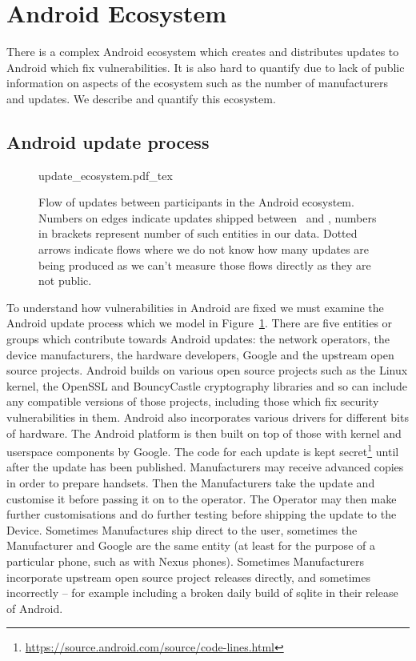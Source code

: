 \documentclass[conference,a4paper,twoside]{IEEEtran}
\let\OldTodo\todo
\renewcommand{\todo}{\OldTodo[inline]}
\newcommand{\todolater}[1]{}%
\begin{document}
\section{Android Ecosystem}
There is a complex Android ecosystem which creates and distributes updates to Android which fix vulnerabilities.
It is also hard to quantify due to lack of public information on aspects of the ecosystem such as the number of manufacturers and updates.
We describe and quantify this ecosystem.


\subsection{Android update process}

\label{sec:android_update_process}
\begin{figure}
 \centering
 \def\svgwidth{\columnwidth}
 {update_ecosystem.pdf_tex}
 \caption{Flow of updates between participants in the Android ecosystem.
 Numbers on edges indicate updates shipped between \daStartDate\ and \daEndDate, numbers in brackets represent number of such entities in our data.
 Dotted arrows indicate flows where we do not know how many updates are being produced as we can't measure those flows directly as they are not public.}
 \label{fig:update_ecosystem}
\end{figure}
To understand how vulnerabilities in Android are fixed we must examine the Android update process which we model in Figure~\ref{fig:update_ecosystem}.
There are five entities or groups which contribute towards Android updates: the network operators, the device manufacturers, the hardware developers, Google and the upstream open source projects.
Android builds on various open source projects such as the Linux kernel, the OpenSSL and BouncyCastle cryptography libraries and so can include any compatible versions of those projects, including those which fix security vulnerabilities in them.
Android also incorporates various drivers for different bits of hardware.
The Android platform is then built on top of those with kernel and userspace components by Google.
The code for each update is kept secret\footnote{\url{https://source.android.com/source/code-lines.html}}\todolater{Can we quantify this keeping the code secret? Is it worth it?} until after the update has been published.
Manufacturers may receive advanced copies in order to prepare handsets.
Then the Manufacturers take the update and customise it before passing it on to the operator.
The Operator may then make further customisations and do further testing before shipping the update to the Device.
Sometimes Manufactures ship direct to the user, sometimes the Manufacturer and Google are the same entity (at least for the purpose of a particular phone, such as with Nexus phones).
Sometimes Manufacturers incorporate upstream open source project releases directly, and sometimes incorrectly -- for example including a broken daily build of sqlite in their release of Android.
\todolater{use statistics from samsung-updates.com -> how many binaries are there per device?}
\end{document}
